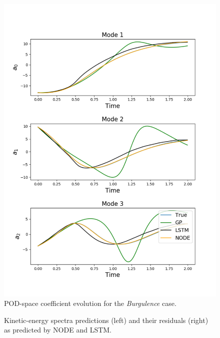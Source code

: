 \documentclass[preprint,12pt]{elsarticle}
\begin{document}
\begin{figure}
	\centering
	\includegraphics[width=\textwidth]{Figure_13.pdf}
	\caption{POD-space coefficient evolution for the \emph{Burgulence} case.}
	\label{Figure10}
\end{figure}

\begin{figure}
	\centering
	\caption{Kinetic-energy spectra predictions (left) and their residuals (right) as predicted by NODE and LSTM.}
	\label{Figure11}
\end{figure}
\end{document}
